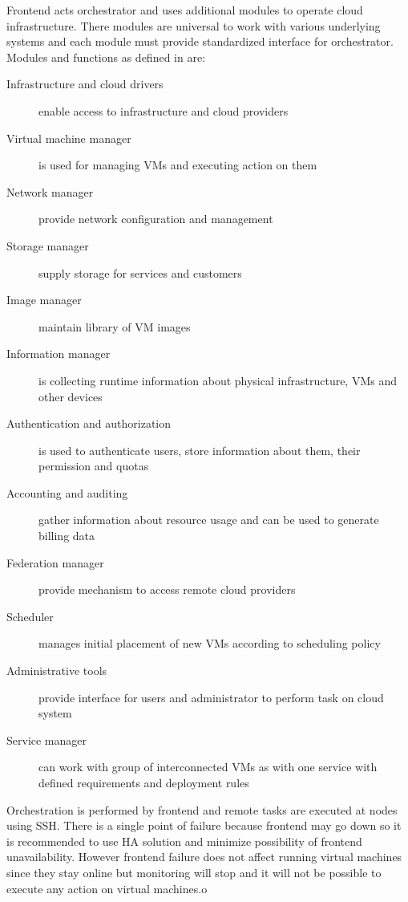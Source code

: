 Frontend acts orchestrator and uses additional modules to operate cloud infrastructure. There modules are universal to work with various underlying systems and each module must provide standardized interface for orchestrator. Modules and functions as defined in \cite{opennebula} are:
\begin{description}
	\item[Infrastructure and cloud drivers] enable access to infrastructure and cloud providers
	\item[Virtual machine manager] is used for managing \Ac{VM}s and executing action on them
	\item[Network manager] provide network configuration and management
	\item[Storage manager] supply storage for services and customers
	\item[Image manager] maintain library of \Ac{VM} images
	\item[Information manager] is collecting runtime information about physical infrastructure, \Ac{VM}s and other devices
	\item[Authentication and authorization] is used to authenticate users, store information about them, their permission and quotas
	\item[Accounting and auditing] gather information about resource usage and can be used to generate billing data
	\item[Federation manager] provide mechanism to access remote cloud providers
	\item[Scheduler] manages initial placement of new \Ac{VM}s according to scheduling policy
	\item[Administrative tools] provide interface for users and administrator to perform task on cloud system
	\item[Service manager] can work with group of interconnected \Ac{VM}s as with one service with defined requirements and deployment rules
\end{description}

Orchestration is performed by frontend and remote tasks are executed at nodes using \Ac{SSH}. There is a single point of failure because frontend may go down so it is recommended to use \Ac{HA} solution and minimize possibility of frontend unavailability. However frontend failure does not affect running virtual machines since they stay online but monitoring will stop and it will not be possible to execute any action on virtual machines.o

